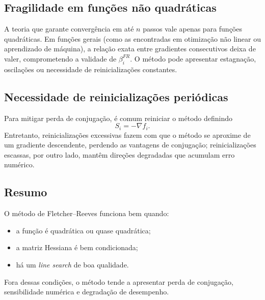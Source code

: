\documentclass[9pt,a4paper]{extarticle}
\begin{document}
\subsection*{Fragilidade em funções não quadráticas}

A teoria que garante convergência em até $n$ passos vale apenas para funções quadráticas. Em funções gerais (como as encontradas em otimização não linear ou aprendizado de máquina), a relação exata entre gradientes consecutivos deixa de valer, comprometendo a validade de $\beta_i^{FR}$. O método pode apresentar estagnação, oscilações ou necessidade de reinicializações constantes.

\subsection*{Necessidade de reinicializações periódicas}

Para mitigar perda de conjugação, é comum reiniciar o método definindo
\[
S_i = -\nabla f_i.
\]
Entretanto, reinicializações excessivas fazem com que o método se aproxime de um gradiente descendente, perdendo as vantagens de conjugação; reinicializações escassas, por outro lado, mantêm direções degradadas que acumulam erro numérico.

\subsection*{Resumo}

O método de Fletcher--Reeves funciona bem quando:
\begin{itemize}
    \item a função é quadrática ou quase quadrática;
    \item a matriz Hessiana é bem condicionada;
    \item há um \textit{line search} de boa qualidade.
\end{itemize}

Fora dessas condições, o método tende a apresentar perda de conjugação, sensibilidade numérica e degradação de desempenho.
\end{document}
